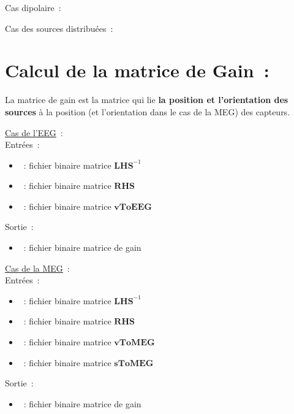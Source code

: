 \medskip

\noindent
Cas dipolaire~:\\
\noindent
{}

\medskip

\noindent
Cas des sources distribuées~:\\
\noindent
{}

\section{Calcul de la matrice de Gain~:}
\label{sect: command gain}

La matrice de gain est la matrice qui lie \textbf{la position et l'orientation des sources} à la position (et l'orientation dans le cas
de la MEG) des capteurs. 

\checkItem \underline{Cas de l'EEG}~:\\
Entrées~:
\begin{itemize}
    \item {}~: fichier binaire matrice $\mathbf{LHS}^{-1}$
    \item {}~: fichier binaire matrice $\mathbf{RHS}$
    \item {}~: fichier binaire matrice $\mathbf{vToEEG}$
\end{itemize}
Sortie~:
\begin{itemize}
    \item {}~: fichier binaire matrice de gain
\end{itemize}

\medskip

\noindent
{}


\bigskip

\checkItem\underline{Cas de la MEG}~:\\
Entrées~:
\begin{itemize}
    \item {}~: fichier binaire matrice $\mathbf{LHS}^{-1}$
    \item {}~: fichier binaire matrice $\mathbf{RHS}$
    \item {}~: fichier binaire matrice $\mathbf{vToMEG}$
    \item {}~: fichier binaire matrice $\mathbf{sToMEG}$
\end{itemize}
Sortie~:
\begin{itemize}
    \item {}~: fichier binaire matrice de gain
\end{itemize}

